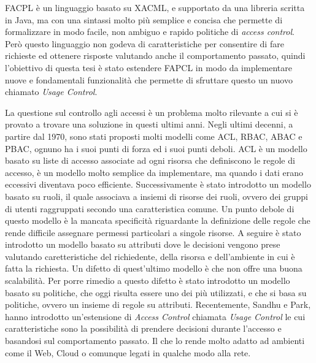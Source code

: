 FACPL è un linguaggio basato su XACML, e supportato da una libreria scritta in Java, ma con una sintassi molto più semplice e concisa che permette di formalizzare in modo facile, non ambiguo e rapido politiche di \textit{access control}. Però questo linguaggio non godeva di caratteristiche per consentire di fare richieste ed ottenere risposte valutando anche il comportamento passato, quindi l'obiettivo di questa tesi è stato estendere FAPCL in modo da implementare nuove e fondamentali funzionalità che permette di sfruttare questo un nuovo chiamato \textit{Usage Control}. \\ \par
La questione sul controllo agli accessi è un problema molto rilevante a cui si è provato a trovare una soluzione in questi ultimi anni. Negli ultimi decenni, a partire dal 1970, sono stati proposti molti modelli come ACL, RBAC, ABAC e PBAC, ognuno ha i suoi punti di forza ed i suoi punti deboli.
ACL è un modello basato su liste di accesso associate ad ogni risorsa che definiscono le regole di accesso, è un modello molto semplice da implementare, ma quando i dati erano eccessivi diventava poco efficiente. Successivamente è stato introdotto un modello basato su ruoli, il quale associava a insiemi di risorse dei ruoli, ovvero dei gruppi di utenti raggruppati secondo una caratteristica comune. Un punto debole di questo modello è la mancata specificità riguardante la definizione delle regole che rende difficile assegnare permessi particolari a singole risorse. A seguire è stato introdotto un modello basato su attributi dove le decisioni vengono prese valutando caretteristiche del richiedente, della risorsa e dell'ambiente in cui è fatta la richiesta. Un difetto di quest'ultimo modello è che non offre una buona scalabilità. Per porre rimedio a questo difetto è stato introdotto un modello basato su politiche, che oggi risulta essere uno dei più utilizzati, e che si basa su politiche, ovvero un insieme di regole su attributi.
Recentemente, Sandhu e Park, hanno introdotto un'estensione di \textit{Access Control} chiamata \textit{Usage Control} le cui caratteristiche sono la possibilità di prendere decisioni durante l'accesso e basandosi sul comportamento passato. Il che lo rende molto adatto ad ambienti come il Web, Cloud o comunque legati in qualche modo alla rete. \\ \par
